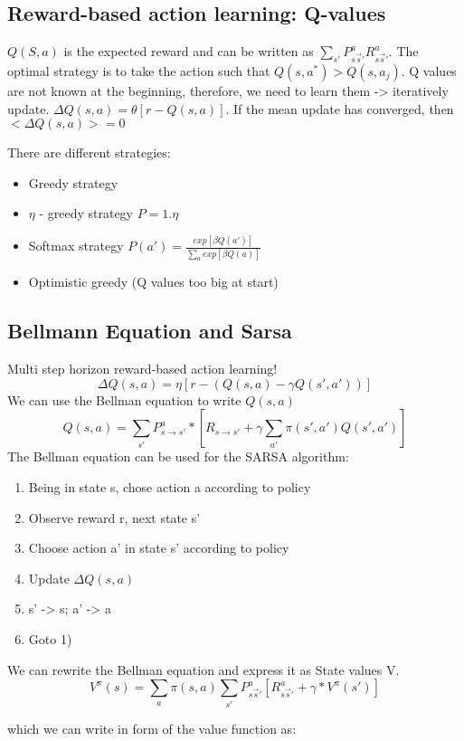 \documentclass[11pt]{article}
\begin{document}
\subsection{Reward-based action learning: Q-values}

$Q(S,a)$ is the expected reward and can be written as $\sum_{s'} P_{s \overrightarrow s'}^a R_{s \overrightarrow s'}^a$. The optimal strategy is to take the action such that $Q(s,a^*) > Q(s, a_j)$. Q values are not known at the beginning, therefore, we need to learn them -> iteratively update. $\Delta Q(s,a) = \theta [r-Q(s,a)]$. If the mean update has converged, then $<\Delta Q(s,a)> = 0$

There are different strategies:
\begin{itemize}
	\item Greedy strategy
	\item $\eta$ - greedy strategy $P = 1 . \eta$
	\item Softmax strategy $P(a') = \frac{exp{[\beta Q(a')]}}{\sum_a exp{[\beta Q(a)]}}$
	\item Optimistic greedy (Q values too big at start)
\end{itemize}

\subsection{Bellmann Equation and Sarsa}
Multi step horizon reward-based action learning!
\[
	\Delta Q(s,a) = \eta [r-(Q(s,a) - \gamma Q(s', a'))]
\]
We can use the Bellman equation to write $Q(s,a)$
\[
	Q(s,a) = \sum_{s'}P_{s \rightarrow s'}^a * [R_{s \rightarrow s'} + \gamma \sum_{a'} \pi(s',a')Q(s',a')]
\]
The Bellman equation can be used for the SARSA algorithm:
\begin{enumerate}
	\item Being in state s, chose action a according to policy
	\item Observe reward r, next state s'
	\item Choose action a' in state s' according to policy
	\item Update $\Delta Q(s,a)$
	\item s' -> s; a' -> a
	\item Goto 1)
\end{enumerate}
We can rewrite the Bellman equation and express it as State values V.
\[
	V^{\pi}(s) = \sum_a \pi(s,a) \sum_{s'} P^a_{s \overrightarrow s'} [R^a_{s \overrightarrow s'} + \gamma * V^{\pi}(s')]
\]

which we can write in form of the value function as:
\end{document}
